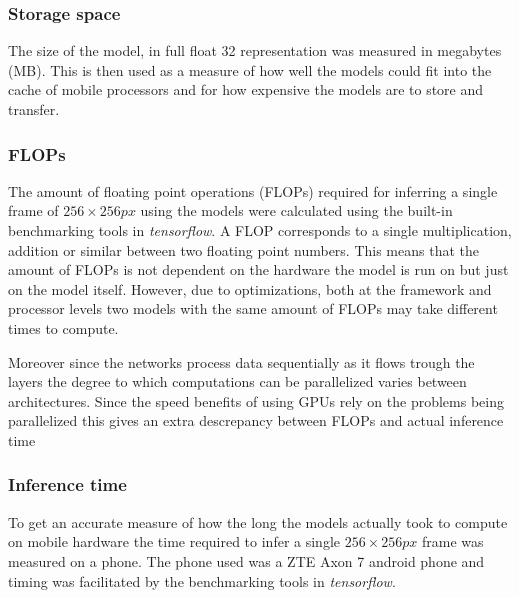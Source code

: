 \documentclass{kththesis}
\begin{document}
\subsubsection{Storage space}
The size of the model, in full float 32 representation was measured in megabytes
(MB). This is then used as a measure of how well the models could fit into the cache of mobile processors and for how expensive the models are to store and
transfer.

\subsubsection{FLOPs}
The amount of floating point operations (FLOPs) required for inferring a single frame
of \(256 \times 256 px\) using the models were calculated using the built-in benchmarking tools in
\textit{tensorflow}. A FLOP corresponds to a single multiplication, addition or
similar between two floating point numbers. This means that the amount of FLOPs is not
dependent on the hardware the model is run on but just on the model itself.
However, due to optimizations, both at the framework and processor levels two
models with the same amount of FLOPs may take different times to compute.

Moreover since the networks process data sequentially as it flows trough
the layers the degree to which computations can be parallelized varies between
architectures. Since the speed benefits of using GPUs rely on the problems being
parallelized this gives an extra descrepancy between FLOPs and actual inference
time

\subsubsection{Inference time}
To get an accurate measure of how the long the models actually took to compute on
mobile hardware the time required to infer a single \(256 \times 256 px\) frame
was measured on a phone. The phone used was a ZTE Axon 7 android phone and
timing was facilitated by the benchmarking tools in \textit{tensorflow}.
\end{document}

